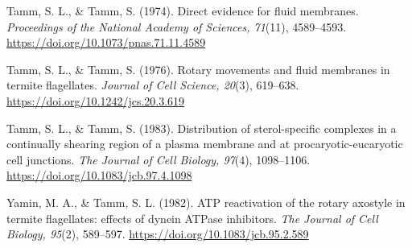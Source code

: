 \documentclass[authordate, editorial]{jote-new-article}
\begin{document}
	



	Tamm, S. L., \& Tamm, S. (1974). Direct evidence for fluid membranes. \emph{Proceedings of} \emph{the National Academy of Sciences, 71}(11), 4589--4593. \url{https://doi.org/10.1073/pnas.71.11.4589}



	



	Tamm, S. L., \& Tamm, S. (1976). Rotary movements and fluid membranes in termite flagellates. \emph{Journal of Cell Science, 20}(3), 619--638. \url{https://doi.org/10.1242/jcs.20.3.619}



	



	Tamm, S. L., \& Tamm, S. (1983). Distribution of sterol-specific complexes in a	continually shearing region of a plasma membrane and at procaryotic-eucaryotic cell junctions. \emph{The Journal of Cell Biology, 97}(4), 1098--1106. \url{https://doi.org/10.1083/jcb.97.4.1098}



	



	Yamin, M. A., \& Tamm, S. L. (1982). ATP reactivation of the rotary axostyle in termite	flagellates: effects of dynein ATPase inhibitors. \emph{The Journal of Cell Biology, 95}(2), 589--597. \url{https://doi.org/10.1083/jcb.95.2.589}
\end{document}
